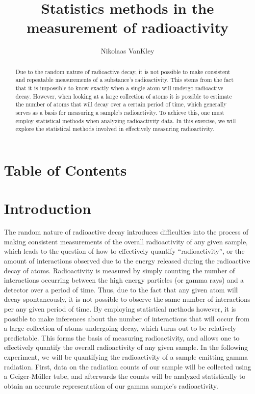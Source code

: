 \documentclass[12pt]{article}   	%
\title{Statistics methods in the measurement of radioactivity}
\author{Nikolaas VanKley}
\date{}							%
\begin{document}
\maketitle
\begin{abstract}
 Due to the random nature of radioactive decay, it is not possible to make consistent and repeatable measurements of a 
 substance's radioactivity. This stems from the fact that it is impossible to know exactly when a single atom will undergo 
 radioactive decay. However, when looking at a large collection of atoms it is possible to estimate the number of atoms that will
 decay over a certain period of time, which generally serves as a basis for measuring a sample's radioactivity. To achieve this, one must employ statistical methods when analyzing radioactivity data. In this exercise, we will explore the statistical
 methods involved in effectively measuring radioactivity.
\end{abstract}
\pagebreak
\section{Table of Contents}
\section{Introduction}
 The random nature of radioactive decay introduces difficulties into the process of making consistent measurements of the overall
 radioactivity of any given sample, which leads to the question of how to effectively quantify “radioactivity”, or the amount of
 interactions observed due to the energy released during the radioactive decay of atoms. Radioactivity is measured by simply
 counting the number of interactions occurring between the high energy particles (or gamma rays) and a detector over a period of 
 time. Thus, due to the fact that any given atom will decay spontaneously, it is not possible to observe the same number of
 interactions per any given period of time. By employing statistical methods however, it is possible to make inferences about the
 number of interactions that will occur from a large collection of atoms undergoing decay, which turns out to be relatively
 predictable. This forms the basis of measuring radioactivity, and allows one to effectively quantify the overall radioactivity
 of any given sample. In the following experiment, we will be quantifying the radioactivity of a sample emitting gamma radiation.
 First, data on the radiation counts of our sample will be collected using a Geiger-Müller tube, and afterwards the counts will
 be analyzed statistically to obtain an accurate representation of our gamma sample's radioactivity. 
\end{document}
